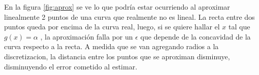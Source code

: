 En la figura \ref{fig:aprox} se ve lo que podría estar ocurriendo al aproximar linealmente 2 puntos de una curva que realmente no es lineal. La recta entre dos puntos queda por encima de la curva real, luego, si se quiere hallar el $x$ tal que $g(x) = \alpha$ , la aproximación falla por un $\epsilon$ que depende de la concavidad de la curva respecto a la recta. A medida que se van agregando radios a la discretizacion, la distancia entre los puntos que se aproximan disminuye, disminuyendo el error cometido al estimar. 

